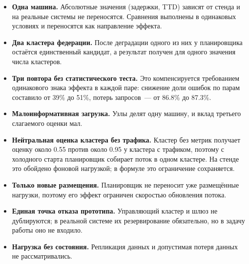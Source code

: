 \begin{itemize}
  \item \textbf{Одна машина.} Абсолютные значения (задержки, TTD) зависят от
        стенда и на реальные системы не переносятся. Сравнения выполнены в
        одинаковых условиях и переносятся как направление эффекта.
  \item \textbf{Два кластера федерации.} После деградации одного из них у
        планировщика остаётся единственный кандидат, а результат получен
        для одного значения числа кластеров.
  \item \textbf{Три повтора без статистического теста.} Это компенсируется
        требованием одинакового знака эффекта в каждой паре: снижение доли
        ошибок по парам составило от 39\% до 51\%, потерь запросов~--- от
        86.8\% до 87.3\%.
  \item \textbf{Малоинформативная загрузка.} Узлы делят одну машину, и вклад
        третьего слагаемого оценки мал.
  \item \textbf{Нейтральная оценка кластера без трафика.} Кластер без
        метрик получает оценку около 0.55 против около 0.95 у кластера с
        трафиком, поэтому с холодного старта планировщик собирает поток в
        одном кластере. На стенде это обойдено фоновой нагрузкой; в формуле
        это ограничение сохраняется.
  \item \textbf{Только новые размещения.} Планировщик не переносит уже
        размещённые нагрузки, поэтому его эффект ограничен скоростью
        обновления потока.
  \item \textbf{Единая точка отказа прототипа.} Управляющий кластер и шлюз
        не дублируются; в реальной системе их резервирование обязательно,
        но в задачу работы оно не входило.
  \item \textbf{Нагрузка без состояния.} Репликация данных и допустимая
        потеря данных не рассматривались.
\end{itemize}
